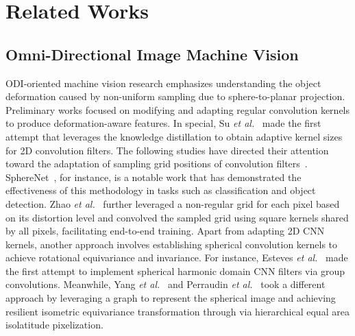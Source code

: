 \section{Related Works}
\label{sec_background}
\subsection{Omni-Directional Image Machine Vision}
ODI-oriented machine vision research emphasizes understanding the object deformation caused by non-uniform sampling due to sphere-to-planar projection.
%
Preliminary works focused on modifying and adapting regular convolution kernels to produce deformation-aware features.
%
In special, Su \textit{et al.}~\cite{su2017learning} made the first attempt that leverages the knowledge distillation to obtain adaptive kernel sizes for 2D convolution filters.
%
%
%
The following studies have directed their attention toward the adaptation of sampling grid positions of convolution filters~\cite{tateno2018distortion}.
%
SphereNet~\cite{coors2018spherenet}, for instance, is a notable work that has demonstrated the effectiveness of this methodology in tasks such as classification and object detection.
%
Zhao \textit{et al.}~\cite{zhao2018distortion} further leveraged a non-regular grid for each pixel based on its distortion level and convolved the sampled grid using square kernels shared by all pixels, facilitating end-to-end training.
%
Apart from adapting 2D CNN kernels, another approach involves establishing spherical convolution kernels to achieve rotational equivariance and invariance.
%
For instance, Esteves \textit{et al.}~\cite{esteves2018learning} made the first attempt to implement spherical harmonic domain CNN filters via group convolutions.
Meanwhile, Yang \textit{et al.}~\cite{yang2020rotation} and Perraudin \textit{et al.}~\cite{perraudin2019deepsphere} took a different approach by leveraging a graph to represent the spherical image and achieving resilient isometric equivariance transformation through via hierarchical equal area isolatitude pixelization.

%
